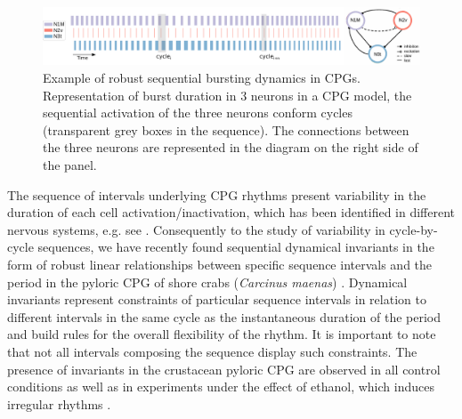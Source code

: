 \begin{figure}[htb]
	\includegraphics[width=\textwidth]{img/invariants/variability/sequences_in_cpgs.pdf}
	\caption{Example of robust sequential bursting dynamics in CPGs. Representation of burst duration in 3 neurons in a CPG model, the sequential activation of the three neurons conform cycles (transparent grey boxes in the sequence). The connections between the three neurons are represented in the diagram on the right side of the panel.}
	\label{fig:sequences_in_cpgs}
	
\end{figure}

The sequence of intervals underlying CPG rhythms present variability in the duration of each cell activation/inactivation, which has been identified in different nervous systems, e.g. see \cite{reyes_artificial_2008,elliott_temporal_1991,martinez_short-term_2019}. Consequently to the study of variability in cycle-by-cycle sequences, we have recently found sequential dynamical invariants in the form of robust linear relationships between specific sequence intervals and the period in the pyloric CPG of shore crabs (\textit{Carcinus maenas}) \cite{elices_robust_2019}. Dynamical invariants represent constraints of particular sequence intervals in relation to different intervals in the same cycle as the instantaneous duration of the period and build rules for the overall flexibility of the rhythm. It is important to note that not all intervals composing the sequence display such constraints. The presence of invariants in the crustacean pyloric CPG are observed in all control conditions as well as in experiments under the effect of ethanol, which induces irregular rhythms \cite{elices_robust_2019}. 



